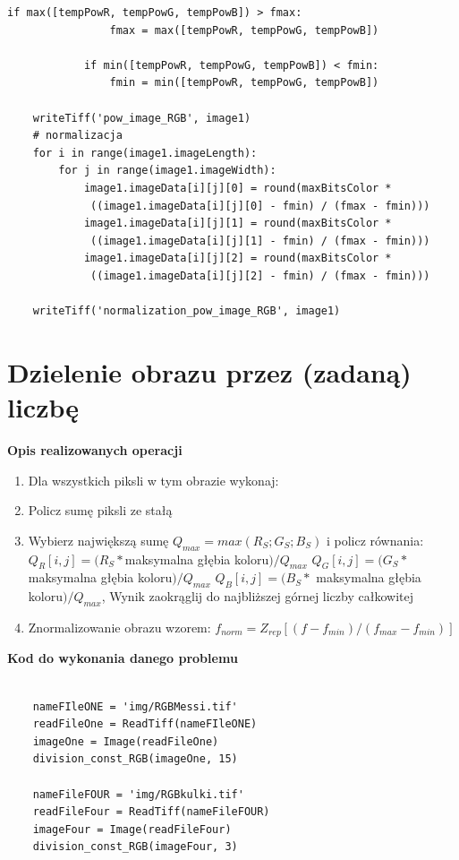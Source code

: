 \documentclass[magisterska,openany]{pracadypl}
\begin{document}
\begin{lstlisting}[caption={Potęgowanie obrazu}]
            if max([tempPowR, tempPowG, tempPowB]) > fmax:
                fmax = max([tempPowR, tempPowG, tempPowB])

            if min([tempPowR, tempPowG, tempPowB]) < fmin:
                fmin = min([tempPowR, tempPowG, tempPowB])

    writeTiff('pow_image_RGB', image1)
    # normalizacja
    for i in range(image1.imageLength):
        for j in range(image1.imageWidth):
            image1.imageData[i][j][0] = round(maxBitsColor *
             ((image1.imageData[i][j][0] - fmin) / (fmax - fmin)))
            image1.imageData[i][j][1] = round(maxBitsColor *
             ((image1.imageData[i][j][1] - fmin) / (fmax - fmin)))
            image1.imageData[i][j][2] = round(maxBitsColor *
             ((image1.imageData[i][j][2] - fmin) / (fmax - fmin)))

    writeTiff('normalization_pow_image_RGB', image1)

\end{lstlisting}
\newpage


\section{Dzielenie obrazu przez (zadaną) liczbę}

\textbf{\Large Opis realizowanych operacji}
\begin{enumerate}
\item Dla wszystkich piksli w tym obrazie wykonaj:
\item Policz sumę piksli ze stałą
\item Wybierz największą sumę $Q_{max}=max(R_S;G_S;B_S)$ i \newline policz równania: \newline $Q_R[i,j]=(R_S*$maksymalna głębia koloru$)/Q_{max}$ \newline $Q_G[i,j]=(G_S*$ maksymalna głębia koloru$)/Q_{max}$ \newline $Q_B[i,j]=(B_S*$ maksymalna głębia koloru$)/Q_{max}$, \newline Wynik zaokrąglij do najbliższej górnej liczby całkowitej
\item Znormalizowanie obrazu wzorem:
\newline $f_{norm}=Z_{rep}[(f-f_{min})/(f_{max}-f_{min})]$
\end{enumerate}

\vspace{0.5cm}
\textbf{\Large Kod do wykonania danego problemu}
\lstset{language=Python}
\vspace{0.25cm}
\begin{lstlisting}

	nameFIleONE = 'img/RGBMessi.tif'
	readFileOne = ReadTiff(nameFIleONE)
	imageOne = Image(readFileOne)
	division_const_RGB(imageOne, 15)
	
	nameFileFOUR = 'img/RGBkulki.tif'
	readFileFour = ReadTiff(nameFileFOUR)
	imageFour = Image(readFileFour)
	division_const_RGB(imageFour, 3)

\end{lstlisting}
\newpage
\end{document}
